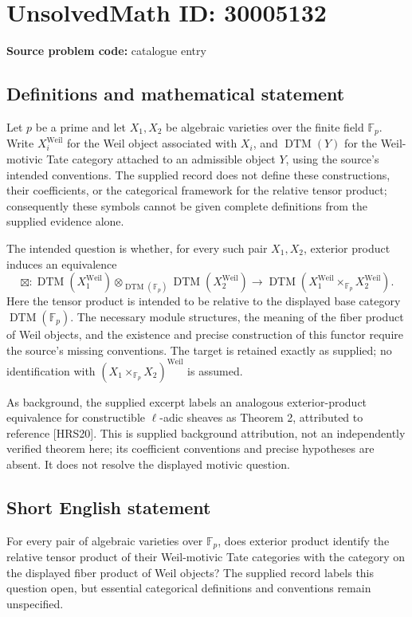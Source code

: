 \documentclass[11pt]{article}
\newcommand{\F}{\mathbb{F}}
\begin{document}
\section*{UnsolvedMath ID: 30005132}
\textbf{Source problem code:} catalogue entry
\subsection{Definitions and mathematical statement}
Let \(p\) be a prime and let \(X_1,X_2\) be algebraic varieties over the finite field \(\F_p\). Write \(X_i^{\mathrm{Weil}}\) for the Weil object associated with \(X_i\), and \(\operatorname{DTM}(Y)\) for the Weil-motivic Tate category attached to an admissible object \(Y\), using the source's intended conventions. The supplied record does not define these constructions, their coefficients, or the categorical framework for the relative tensor product; consequently these symbols cannot be given complete definitions from the supplied evidence alone.

The intended question is whether, for every such pair \(X_1,X_2\), exterior product induces an equivalence
\[
\boxtimes:\operatorname{DTM}(X_1^{\mathrm{Weil}})
\otimes_{\operatorname{DTM}(\F_p)}
\operatorname{DTM}(X_2^{\mathrm{Weil}})
\longrightarrow
\operatorname{DTM}\!\left(X_1^{\mathrm{Weil}}\times_{\F_p}X_2^{\mathrm{Weil}}\right).
\]
Here the tensor product is intended to be relative to the displayed base category \(\operatorname{DTM}(\F_p)\). The necessary module structures, the meaning of the fiber product of Weil objects, and the existence and precise construction of this functor require the source's missing conventions. The target is retained exactly as supplied; no identification with \((X_1\times_{\F_p}X_2)^{\mathrm{Weil}}\) is assumed.

As background, the supplied excerpt labels an analogous exterior-product equivalence for constructible \(\ell\)-adic sheaves as Theorem 2, attributed to reference [HRS20]. This is supplied background attribution, not an independently verified theorem here; its coefficient conventions and precise hypotheses are absent. It does not resolve the displayed motivic question.
\subsection{Short English statement}
For every pair of algebraic varieties over \(\F_p\), does exterior product identify the relative tensor product of their Weil-motivic Tate categories with the category on the displayed fiber product of Weil objects? The supplied record labels this question open, but essential categorical definitions and conventions remain unspecified.
\end{document}
